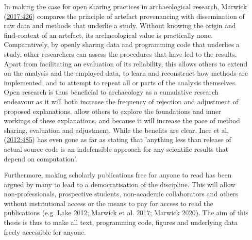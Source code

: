 \documentclass[
  12pt,
  a4paper,
  oneside]{book}
\begin{document}
In making the case for open sharing practices in archaeological research, Marwick (\protect\hyperlink{ref-marwick2017}{2017:426}) compares the principle of artefact provenancing with dissemination of raw data and methods that underlie a study. Without knowing the origin and find-context of an artefact, its archaeological value is practically none. Comparatively, by openly sharing data and programming code that underlies a study, other researchers can assess the procedures that have led to the results. Apart from facilitating an evaluation of its reliability, this allows others to extend on the analysis and the employed data, to learn and reconstruct how methods are implemented, and to attempt to repeat all or parts of the analysis themselves. Open research is thus beneficial to archaeology as a cumulative research endeavour as it will both increase the frequency of rejection and adjustment of proposed explanations, allow others to explore the foundations and inner workings of these explanations, and because it will increase the pace of method sharing, evaluation and adjustment. While the benefits are clear, Ince et al. (\protect\hyperlink{ref-ince2012}{2012:485}) has even gone as far as stating that 'anything less than release of actual source code is an indefensible approach for any scientific results that depend on computation'.

Furthermore, making scholarly publications free for anyone to read has been argued by many to lead to a democratisation of the discipline. This will allow non-professionals, prospective students, non-academic collaborators and others without institutional access or the means to pay for access to read the publications (e.g. \protect\hyperlink{ref-lake2012}{Lake 2012}; \protect\hyperlink{ref-marwick2017a}{Marwick et al. 2017}; \protect\hyperlink{ref-marwick2020}{Marwick 2020}). The aim of this thesis is thus to make all text, programming code, figures and underlying data freely accessible for anyone.
\end{document}
